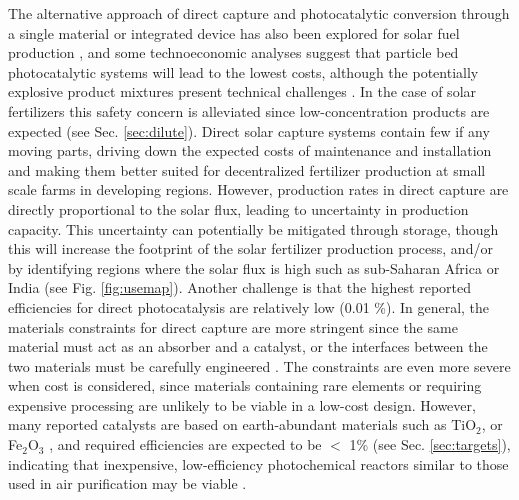 The alternative approach of direct capture and photocatalytic conversion through a single material or integrated device has also been explored for solar fuel production \cite{Montoya_2017, Lewis_2016, Pinaud_2013}, and some technoeconomic analyses suggest that particle bed photocatalytic systems will lead to the lowest costs, although the potentially explosive product mixtures present technical challenges \cite{Pinaud_2013}. In the case of solar fertilizers this safety concern is alleviated since low-concentration products are expected (see Sec. \ref{sec:dilute}). Direct solar capture systems contain few if any moving parts, driving down the expected costs of maintenance and installation and making them better suited for decentralized fertilizer production at small scale farms in developing regions. However, production rates in direct capture are directly proportional to the solar flux, leading to uncertainty in production capacity. This uncertainty can potentially be mitigated through storage, though this will increase the footprint of the solar fertilizer production process, and/or by identifying regions where the solar flux is high such as sub-Saharan Africa or India (see Fig. \ref{fig:usemap}). Another challenge is that the highest reported efficiencies for direct photocatalysis are relatively low (0.01 \%). In general, the materials constraints for direct capture are more stringent since the same material must act as an absorber and a catalyst, or the interfaces between the two materials must be carefully engineered \cite{Montoya_2017}. The constraints are even more severe when cost is considered, since materials containing rare elements or requiring expensive processing are unlikely to be viable in a low-cost design. However, many reported catalysts are based on earth-abundant materials such as TiO$_2$, or Fe$_2$O$_3$ \cite{FUJISHIMA_1972,Hardee_1976,Medford_2017}, and required efficiencies are expected to be $<$ 1\% (see Sec. \ref{sec:targets}), indicating that inexpensive, low-efficiency photochemical reactors similar to those used in air purification may be viable \cite{Birnie2006, Bhatkhande_2001,Parkin_2005}.

